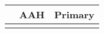 \begin{tabular}{lcc}
\toprule
{} & AAH & Primary \\
\midrule
{} &     &         \\
\bottomrule
\end{tabular}
